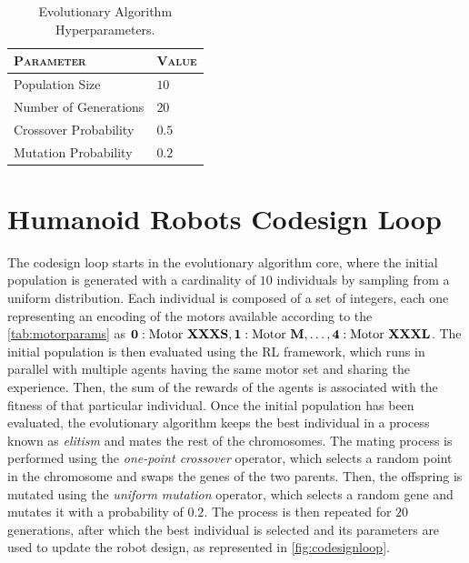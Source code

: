 \begin{table}
    \centering
    \begin{tabular}{ll}
        \toprule
        \textsc{Parameter}    & \textsc{Value} \\
        \midrule
        Population Size       & $10$           \\
        Number of Generations & $20$           \\
        Crossover Probability & $0.5$          \\
        Mutation Probability  & $0.2$          \\
        \bottomrule
    \end{tabular}
    \caption{Evolutionary Algorithm Hyperparameters.}
\end{table}

\section{Humanoid Robots Codesign Loop}
\label{sec:Codesign}

The codesign loop starts in the evolutionary algorithm core, where the initial population is generated with a cardinality of $10$ individuals by sampling from a uniform distribution. Each individual is composed of a set of integers, each one representing an encoding of the motors available according to the \cref{tab:motorparams} as $\mathbf{0}: \text{Motor \textbf{XXXS}}, \mathbf{1}:\text{Motor \textbf{M}}, \dots, \mathbf{4}:\text{Motor \textbf{XXXL}}$. The initial population is then evaluated using the \ac{RL} framework, which runs in parallel with multiple agents having the same motor set and sharing the experience. Then, the sum of the rewards of the agents is associated with the fitness of that particular individual. Once the initial population has been evaluated, the evolutionary algorithm keeps the best individual in a process known as \textit{elitism} and mates the rest of the chromosomes. The mating process is performed using the \textit{one-point crossover} operator, which selects a random point in the chromosome and swaps the genes of the two parents. Then, the offspring is mutated using the \textit{uniform mutation} operator, which selects a random gene and mutates it with a probability of $0.2$. The process is then repeated for $20$ generations, after which the best individual is selected and its parameters are used to update the robot design, as represented in \cref{fig:codesignloop}.

